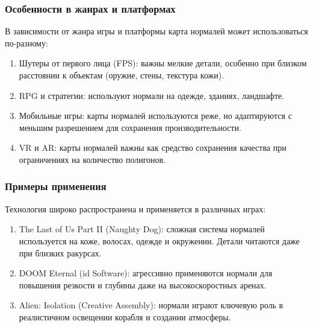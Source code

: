 \subsubsection{Особенности в жанрах и платформах}

В зависимости от жанра игры и платформы карта нормалей может использоваться по-разному:
\begin{enumerate}
	\item Шутеры от первого лица (FPS): важны мелкие детали, особенно при близком расстоянии к объектам (оружие, стены, текстура кожи).
	\item RPG и стратегии: используют нормали на одежде, зданиях, ландшафте.
	\item Мобильные игры: карты нормалей используются реже, но адаптируются с меньшим разрешением для сохранения производительности.
	\item VR и AR: карты нормалей важны как средство сохранения качества при ограничениях на количество полигонов.
\end{enumerate}
\subsubsection{Примеры применения}

Технология широко распространена и применяется в различных играх:
\begin{enumerate}
	\item The Last of Us Part II (Naughty Dog): сложная система нормалей используется на коже, волосах, одежде и окружении. Детали читаются даже при близких ракурсах.
	\item DOOM Eternal (id Software): агрессивно применяются нормали для повышения резкости и глубины даже на высокоскоростных аренах.
	\item Alien: Isolation (Creative Assembly): нормали играют ключевую роль в реалистичном освещении корабля и создании атмосферы.
\end{enumerate}
